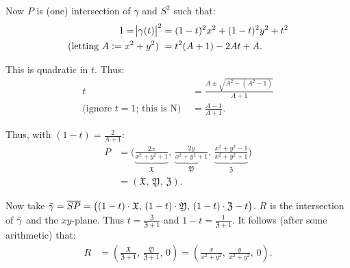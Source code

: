 \begin{center}
\end{center}




Now $P$ is (one) intersection of $\gamma$ and $S^2$ such that:
\begin{align*}
    1 = \abs{\gamma(t) }^2 &= (1-t)^2x^2 + (1-t)^2 y^2 + t^2\\
    \text{(letting $A \vcentcolon = x^2 + y^2$) } &= t^2 (A+1) - 2At + A .
\end{align*}

This is quadratic in $t$. Thus:
\begin{align*}
    t &= \frac{A \pm \sqrt{A^2 - (A^2 - 1)}}{A+1}\\ \text{(ignore $t=1$; this is N) } &= \frac{A-1}{A+1}.
\end{align*}

Thus, with $(1-t) = \frac{2}{A+1}$:
\begin{align*}
    P &= \bigg( \underbrace{\frac{2x}{x^2+y^2+1} }_{\mathfrak{X}}, \,  \underbrace{\frac{2y}{x^2+y^2+1}}_{\mathfrak{Y}} , \, \underbrace{\frac{x^2+y^2-1}{x^2+y^2+1}}_{\mathfrak{Z}}  \bigg)\\
    &= \left( \mathfrak{X}, \, \mathfrak{Y}, \, \mathfrak{Z} \right).
\end{align*}

Now take $\Tilde{\gamma} = \overline{SP} = \big( (1-t) \cdot \mathfrak{X}, \, (1-t) \cdot \mathfrak{Y}, \, (1-t)\cdot \mathfrak{Z} - t \big)$. $R$ is the intersection of $\Tilde{\gamma}$ and the $xy$-plane. Thus $t = \frac{\mathfrak{Z}}{\mathfrak{Z}+1}$ and $1-t = \frac{1}{\mathfrak{Z} + 1}$. It follows (after some arithmetic) that:
\begin{align*}
    R &= \left( \frac{\mathfrak{X}}{\mathfrak{Z} + 1} , \, \frac{\mathfrak{Y}}{\mathfrak{Z}+1} , \, 0 \right) = \left( \frac{x}{x^2+y^2} , \, \frac{y}{x^2+y^2} , \, 0         \right).
\end{align*}

